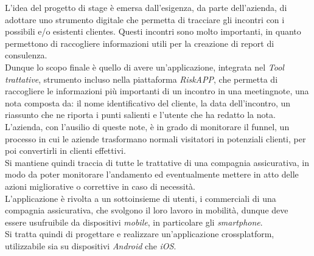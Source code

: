 L'idea del progetto di stage è emersa dall'esigenza, da parte dell'azienda, di adottare uno strumento digitale che permetta di tracciare gli incontri con i possibili e/o esistenti \glspl{cliente}\glsoccur.
Questi incontri sono molto importanti, in quanto permettono di raccogliere informazioni utili per la creazione di report di consulenza.\\
Dunque lo scopo finale è quello di avere un'applicazione, integrata nel \emph{Tool trattative}, strumento incluso nella piattaforma \emph{RiskAPP}, che permetta di raccogliere le informazioni più importanti di un incontro in una \gls{meetingnote}\glsoccur, una nota composta da: il nome identificativo del \gls{cliente}\glsoccur, la data dell'incontro, un riassunto che ne riporta i punti salienti e l'utente che ha redatto la nota.\\
L'azienda, con l'ausilio di queste note, è in grado di monitorare il \gls{funnel}\glsoccur, un processo in cui le aziende trasformano normali visitatori in potenziali clienti, per poi convertirli in clienti effettivi. \\
Si mantiene quindi traccia di tutte le trattative di una compagnia assicurativa, in modo da poter monitorare l'andamento ed eventualmente mettere in atto delle azioni migliorative o correttive in caso di necessità.\\
L'applicazione è rivolta a un sottoinsieme di utenti, i commerciali di una compagnia assicurativa, che svolgono il loro lavoro in mobilità, dunque deve essere usufruibile da dispositivi \emph{mobile}, in particolare gli \emph{smartphone}.\\
Si tratta quindi di progettare e realizzare un'applicazione \gls{crossplatform}\glsoccur, utilizzabile sia su dispositivi \emph{Android} che \emph{iOS}.


    
    
    
    
    
